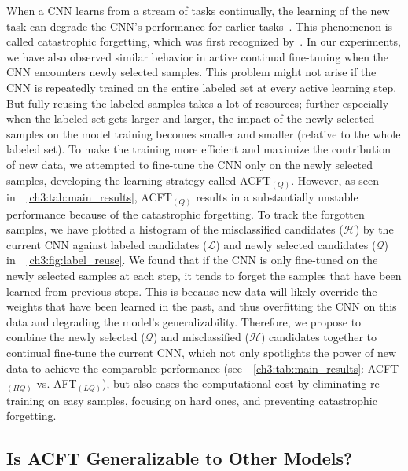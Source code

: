 When a CNN learns from a stream of tasks continually, the learning of the new task can degrade the CNN's performance for earlier tasks~\citep{kirkpatrick2017overcoming,chen2018lifelong,parisi2019continual}. This phenomenon is called catastrophic forgetting, which was first recognized by~\citet{mccloskey1989catastrophic}. In our experiments, we have also observed similar behavior in active continual fine-tuning when the CNN encounters newly selected samples. This problem might not arise if the CNN is repeatedly trained on the entire labeled set at every active learning step. 
But fully reusing the labeled samples takes a lot of resources; further especially when the labeled set gets larger and larger, the impact of the newly selected samples on the model training becomes smaller and smaller (relative to the whole labeled set).
To make the training more efficient and maximize the contribution of new data, we attempted to fine-tune the CNN only on the newly selected samples, developing the learning strategy called ACFT$_{(Q)}$. However, as seen in~\tableautorefname~\ref{ch3:tab:main_results}, ACFT$_{(Q)}$ results in a substantially unstable performance because of the catastrophic forgetting. To track the forgotten samples, we have plotted a histogram of the misclassified candidates ($\mathcal{H}$) by the current CNN against labeled candidates ($\mathcal{L}$) and newly selected candidates ($\mathcal{Q}$) in~\figurename~\ref{ch3:fig:label_reuse}. We found that if the CNN is only fine-tuned on the newly selected samples at each step, it tends to forget the samples that have been learned from previous steps. This is because new data will likely override the weights that have been learned in the past, and thus overfitting the CNN on this data and degrading the model's generalizability. Therefore, we propose to combine the newly selected ($\mathcal{Q}$) and misclassified ($\mathcal{H}$) candidates together to continual fine-tune the current CNN, which not only spotlights the power of new data to achieve the comparable performance (see~\tableautorefname~\ref{ch3:tab:main_results}: ACFT$_{(HQ)}$ vs. AFT$_{(LQ)}$), but also eases the computational cost by eliminating re-training on easy samples, focusing on hard ones, and preventing catastrophic forgetting. 

\subsection{Is ACFT Generalizable to Other Models?}
\label{ch3:discussion_conclusion:generalizable_other_models}

